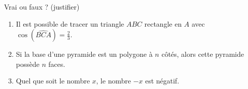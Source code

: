 
\begin{exercice}\label{exo2smath-0245}

    Vrai ou faux ? (justifier)
    \begin{enumerate}
        \item
            Il est possible de tracer un triangle \( ABC\) rectangle en \( A\) avec \( \cos(\widehat{BCA})=\frac{ 2 }{ 3 }\).
        \item
            Si la base d'une pyramide est un polygone à \( n\) côtés, alors cette pyramide possède \( n\) faces.
        \item
            Quel que soit le nombre \( x\), le nombre \( -x\) est négatif.
    \end{enumerate}

\end{exercice}

